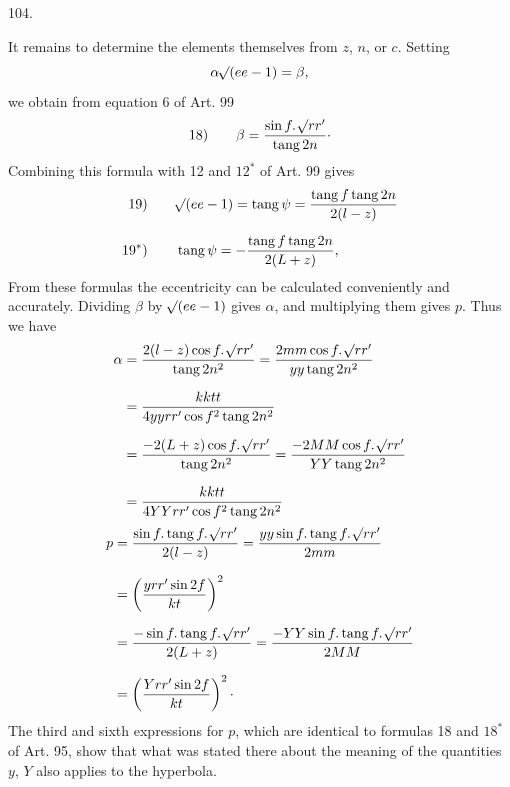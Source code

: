 \par{}\medskip
\hypertarget{native-143-article104}{}
\begin{center}104.\end{center}
It remains to determine the elements themselves from $z$, $n$, or $c$. Setting
\[
\alpha\mathord{{}^{}\!\surd}(ee-1)=\beta,
\]
\noindent we obtain from equation 6 of Art. 99
\[
\mathrm{18)}\qquad\beta=\frac{\sin f\mathpunct{.}\mathord{{}^{}\!\surd}rr'}{\operatorname{tang}2n}\mathpunct{\cdot}
\]
\noindent Combining this formula with 12 and $12^*$ of Art. 99 gives
\[
\begin{aligned}
\mathrm{19)}\qquad&\mathord{{}^{}\!\surd}(ee-1)=\operatorname{tang}\psi=\frac{\operatorname{tang}f\operatorname{tang}2n}{2(l-z)}\\[.6em]
\mathrm{19^*)}\qquad&\operatorname{tang}\psi=-\frac{\operatorname{tang}f\operatorname{tang}2n}{2(L+z)},
\end{aligned}
\]
\noindent From these formulas the eccentricity can be calculated conveniently and accurately. Dividing $\beta$ by $\mathord{{}^{}\!\surd}(ee-1)$ gives $\alpha$, and multiplying them gives $p$. Thus we have
\[
\begin{aligned}
\alpha&=\frac{2(l-z)\cos f\mathpunct{.}\mathord{{}^{}\!\surd}rr'}{\operatorname{tang}2n^2}
=\frac{2mm\cos f\mathpunct{.}\mathord{{}^{}\!\surd}rr'}{yy\operatorname{tang}2n^2}\\[.7em]
&=\frac{kktt}{4yyrr'\cos f^2\operatorname{tang}2n^2}\\[.7em]
&=\frac{-2(L+z)\cos f\mathpunct{.}\mathord{{}^{}\!\surd}rr'}{\operatorname{tang}2n^2}
=\frac{-2MM\cos f\mathpunct{.}\mathord{{}^{}\!\surd}rr'}{YY\operatorname{tang}2n^2}\\[.7em]
&=\frac{kktt}{4YYrr'\cos f^2\operatorname{tang}2n^2}
\end{aligned}
\]
\[
\begin{aligned}
p&=\frac{\sin f\mathpunct{.}\operatorname{tang}f\mathpunct{.}\mathord{{}^{}\!\surd}rr'}{2(l-z)}
=\frac{yy\sin f\mathpunct{.}\operatorname{tang}f\mathpunct{.}\mathord{{}^{}\!\surd}rr'}{2mm}\\[.7em]
&=\left(\frac{yrr'\sin2f}{kt}\right)^2\\[.7em]
&=\frac{-\sin f\mathpunct{.}\operatorname{tang}f\mathpunct{.}\mathord{{}^{}\!\surd}rr'}{2(L+z)}
=\frac{-YY\sin f\mathpunct{.}\operatorname{tang}f\mathpunct{.}\mathord{{}^{}\!\surd}rr'}{2MM}\\[.7em]
&=\left(\frac{Yrr'\sin2f}{kt}\right)^2\mathpunct{\cdot}
\end{aligned}
\]
\noindent{}The third and sixth expressions for $p$, which are identical to formulas 18 and $18^*$ of Art. 95, show that what was stated there about the meaning of the quantities $y$, $Y$ also applies to the hyperbola.
